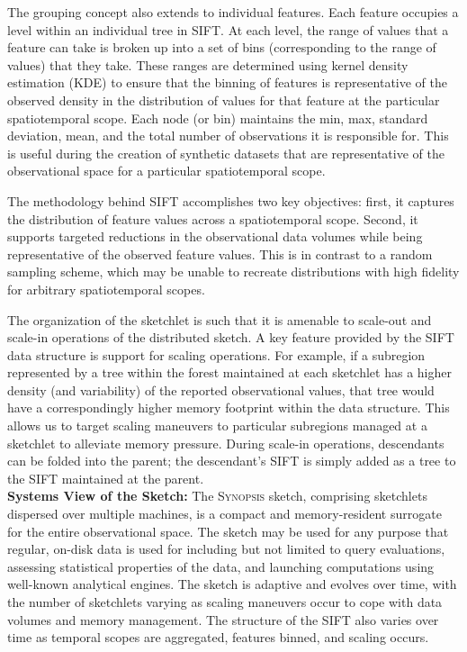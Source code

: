 The grouping concept also extends to individual features. Each feature occupies a level within an individual tree in SIFT. At each level, the range of values that a feature can take is broken up into a set of bins (corresponding to the range of values) that they take. These ranges are determined using kernel density estimation (KDE) to ensure that the binning of features is representative of the observed density in the distribution of values for that feature at the particular spatiotemporal scope. Each node (or bin) maintains the min, max, standard deviation, mean, and the total number of observations it is responsible for.  This is useful during the creation of synthetic datasets that are representative of the observational space for a particular spatiotemporal scope.

The methodology behind SIFT accomplishes two key objectives: first, it captures the distribution of feature values across a spatiotemporal scope. Second, it supports targeted reductions in the observational data volumes while being representative of the observed feature values. This is in contrast to a random sampling scheme, which may be unable to recreate distributions with high fidelity for arbitrary spatiotemporal scopes.

The organization of the sketchlet is such that it is amenable to scale-out and scale-in operations of the distributed sketch. A key feature provided by the SIFT data structure is support for scaling operations. For example, if a subregion represented by a tree within the forest maintained at each sketchlet has a higher density (and variability) of the reported observational values, that tree would have a correspondingly higher memory footprint within the data structure. This allows us to target scaling maneuvers to particular subregions managed at a sketchlet to alleviate memory pressure.  During scale-in operations, descendants can be folded into the parent; the descendant's SIFT is simply added as a tree to the SIFT maintained at the parent.
%
\vspace{0.7em}\\
%
\textbf{Systems View of the Sketch:} The \textsc{Synopsis} sketch, comprising sketchlets dispersed over multiple machines, is a compact and memory-resident surrogate for the entire observational space. The sketch may be used for any purpose that regular, on-disk data is used for including but not limited to query evaluations, assessing statistical properties of the data, and launching computations using well-known analytical engines. The sketch is adaptive and evolves over time, with the number of sketchlets varying as scaling maneuvers occur to cope with data volumes and memory management. The structure of the SIFT also varies over time as temporal scopes are aggregated, features binned, and scaling occurs.
